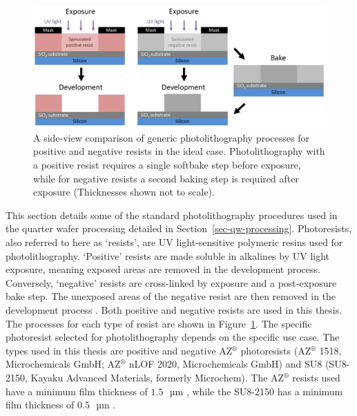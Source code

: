\documentclass[
  a4paper,
]{scrbook}
\begin{document}
\begin{figure}

{\centering \includegraphics{figures/ch4/positive-negative-photolithography.png}

}

\caption{\label{fig-photolithography-types}A side-view comparison of
generic photolithography processes for positive and negative resists in
the ideal case. Photolithography with a positive resist requires a
single softbake step before exposure, while for negative resists a
second baking step is required after exposure (Thicknesses shown not to
scale).}

\end{figure}

This section details some of the standard photolithography procedures
used in the quarter wafer processing detailed in
Section~\ref{sec-qw-processing}. Photoresists, also referred to here as
`resists', are UV light-sensitive polymeric resins used for
photolithography. `Positive' resists are made soluble in alkalines by UV
light exposure, meaning exposed areas are removed in the development
process. Conversely, `negative' resists are cross-linked by exposure and
a post-exposure bake step. The unexposed areas of the negative resist
are then removed in the development process \autocite{Microchemicals}.
Both positive and negative resists are used in this thesis. The
processes for each type of resist are shown in
Figure~\ref{fig-photolithography-types}. The specific photoresist
selected for photolithography depends on the specific use case. The
types used in this thesis are positive and negative AZ\(^\circledR\)
photoresists (AZ\(^\circledR\) 1518, Microchemicals GmbH;
AZ\(^\circledR\) nLOF 2020, Microchemicals GmbH) and SU8 (SU8-2150,
Kayaku Advanced Materials, formerly Microchem). The AZ\(^\circledR\)
resists used have a minimum film thickness of
\(1.5\textrm{ } \textrm{µm}\) \autocite{Microchemicals}, while the
SU8-2150 has a minimum film thickness of \(0.5\textrm{ } \textrm{µm}\)
\autocite{Kayaku}.
\end{document}
